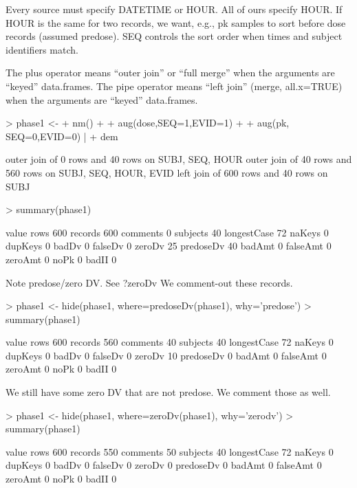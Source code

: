 Every source must specify DATETIME or HOUR.  All of ours specify HOUR.
If HOUR is the same for two records, we want, e.g., pk samples to sort 
before dose records (assumed predose).  SEQ controls the sort order 
when times and subject identifiers match.

The plus operator means ``outer join'' or ``full merge'' when the arguments are ``keyed'' data.frames.
The pipe operator means ``left join'' (merge, all.x=TRUE) when the arguments are ``keyed'' data.frames.
\begin{Schunk}
\begin{Sinput}
> phase1 <- 
+ 	nm() + 
+ 	aug(dose,SEQ=1,EVID=1) + 
+ 	aug(pk,  SEQ=0,EVID=0) | 
+ 	dem
\end{Sinput}
\begin{Soutput}
outer join of 0 rows and 40 rows on SUBJ, SEQ, HOUR
outer join of 40 rows and 560 rows on SUBJ, SEQ, HOUR, EVID
left join of 600 rows and 40 rows on SUBJ
\end{Soutput}
\begin{Sinput}
> summary(phase1)
\end{Sinput}
\begin{Soutput}
            value
rows          600
records       600
comments        0
subjects       40
longestCase    72
naKeys          0
dupKeys         0
badDv           0
falseDv         0
zeroDv         25
predoseDv      40
badAmt          0
falseAmt        0
zeroAmt         0
noPk            0
badII           0
\end{Soutput}
\end{Schunk}
Note predose/zero DV.
See ?zeroDv
We comment-out these records.
\begin{Schunk}
\begin{Sinput}
> phase1 <- hide(phase1, where=predoseDv(phase1), why='predose')
> summary(phase1)
\end{Sinput}
\begin{Soutput}
            value
rows          600
records       560
comments       40
subjects       40
longestCase    72
naKeys          0
dupKeys         0
badDv           0
falseDv         0
zeroDv         10
predoseDv       0
badAmt          0
falseAmt        0
zeroAmt         0
noPk            0
badII           0
\end{Soutput}
\end{Schunk}
We still have some zero DV that are not predose.  We comment those as well.
\begin{Schunk}
\begin{Sinput}
> phase1 <- hide(phase1, where=zeroDv(phase1), why='zerodv')
> summary(phase1)
\end{Sinput}
\begin{Soutput}
            value
rows          600
records       550
comments       50
subjects       40
longestCase    72
naKeys          0
dupKeys         0
badDv           0
falseDv         0
zeroDv          0
predoseDv       0
badAmt          0
falseAmt        0
zeroAmt         0
noPk            0
badII           0
\end{Soutput}
\end{Schunk}
